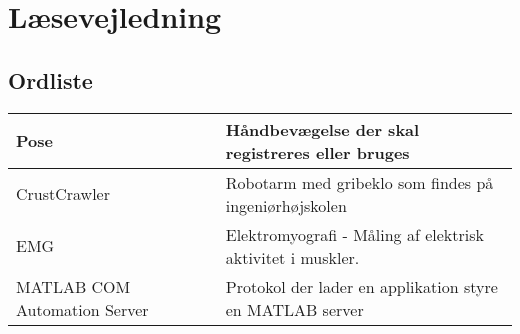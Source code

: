 \section{Læsevejledning}
\subsection*{Ordliste}
\begin{tabular}{p{80pt}lp{240pt}}
	Pose && Håndbevægelse der skal registreres eller bruges\\ \hline
	CrustCrawler && Robotarm med gribeklo som findes på ingeniørhøjskolen\\ \hline
	EMG && Elektromyografi - Måling af elektrisk aktivitet i muskler.\\ \hline
	MATLAB COM Automation Server && Protokol der lader en applikation styre en MATLAB server\citep{RefWorks:5}\\
\end{tabular}